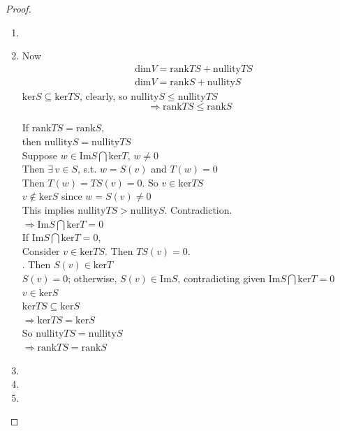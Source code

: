 \begin{proof}
\begin{enumerate}
		\item[(c)]
		\item[(d)] Now 
		\[
		\begin{aligned}
		& \text{dim}V = \text{rank}TS + \text{nullity}TS \\ 
		&  \text{dim}V = \text{rank}S + \text{nullity}S
		\end{aligned}
		\]
		$\text{ker}S \subseteq \text{ker}TS$, clearly, so $\text{nullity}S \leq \text{nullity}TS$ 
		\[
		\Longrightarrow \boxed{ \text{rank}TS \leq \text{rank}S } 
		\]
		
		If $\text{rank}TS = \text{rank}S$, \\
		\phantom{ \quad } then $\text{nullity}S = \text{nullity}TS$ \\
		\phantom{ \, } Suppose $w \in \text{Im}S \bigcap \text{ker}T$, $w \neq 0$ \\
		\phantom{ \quad } Then $\exists \,  v\in S$, s.t. $w = S(v)$ and $T(w)=0$ \\
		\phantom{ \quad \, } Then $T(w) = TS(v) =0$.  So $v\in \text{ker}TS$ \\
		\phantom{ \quad \quad \, } $v\notin \text{ker}S$ since $w = S(v) \neq 0$ \\
		\phantom{ \quad \quad \, } This implies $\text{nullity}TS > \text{nullity}S$.  Contradiction. \\
		$\Longrightarrow \text{Im}S \bigcap \text{ker}T =0$ \\
		
		If $\text{Im}S \bigcap \text{ker}T =0$, \\
		\phantom{ \quad } Consider $v \in \text{ker}TS$.  Then $TS(v)=0$.  \\
		.  Then $S(v)  \in \text{ker}T$ \\
		\phantom{ \quad  } $S(v) =0$; otherwise, $S(v) \in \text{Im}S$, contradicting given $\text{Im}S \bigcap \text{ker}T =0$ \\
		\phantom{ \quad \quad } $v\in \text{ker}S$ \\
		
		$\text{ker}TS \subseteq \text{ker}S$\\
		$\Longrightarrow \text{ker}TS = \text{ker}S$ \\
		So $\text{nullity}TS = \text{nullity}S$  \\
		$\Longrightarrow \text{rank}TS = \text{rank}S$ 
		
		\item[(e)]
		\item[(f)]
		\item[(g)]
	\end{enumerate}
\end{proof}

